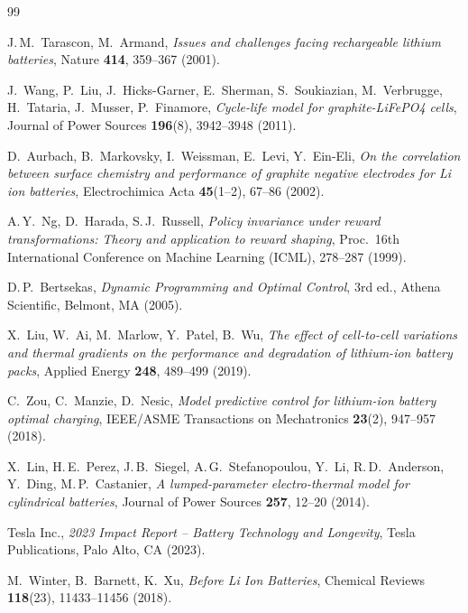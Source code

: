﻿\documentclass[12pt,a4paper]{article}
\begin{document}
	\begin{thebibliography}{99}
		
		J.\,M.\ Tarascon, M.\ Armand,
		\textit{Issues and challenges facing rechargeable lithium batteries},
		Nature \textbf{414}, 359--367 (2001).
		
		J.\ Wang, P.\ Liu, J.\ Hicks-Garner, E.\ Sherman, S.\ Soukiazian, M.\ Verbrugge,
		H.\ Tataria, J.\ Musser, P.\ Finamore,
		\textit{Cycle-life model for graphite-LiFePO4 cells},
		Journal of Power Sources \textbf{196}(8), 3942--3948 (2011).
		
		D.\ Aurbach, B.\ Markovsky, I.\ Weissman, E.\ Levi, Y.\ Ein-Eli,
		\textit{On the correlation between surface chemistry and performance of graphite negative electrodes for Li ion batteries},
		Electrochimica Acta \textbf{45}(1--2), 67--86 (2002).
		
		A.\,Y.\ Ng, D.\ Harada, S.\,J.\ Russell,
		\textit{Policy invariance under reward transformations: Theory and application to reward shaping},
		Proc.\ 16th International Conference on Machine Learning (ICML), 278--287 (1999).
		
		D.\,P.\ Bertsekas,
		\textit{Dynamic Programming and Optimal Control}, 3rd ed.,
		Athena Scientific, Belmont, MA (2005).
		
		X.\ Liu, W.\ Ai, M.\ Marlow, Y.\ Patel, B.\ Wu,
		\textit{The effect of cell-to-cell variations and thermal gradients on the performance and degradation of lithium-ion battery packs},
		Applied Energy \textbf{248}, 489--499 (2019).
		
		C.\ Zou, C.\ Manzie, D.\ Nesic,
		\textit{Model predictive control for lithium-ion battery optimal charging},
		IEEE/ASME Transactions on Mechatronics \textbf{23}(2), 947--957 (2018).
		
		X.\ Lin, H.\,E.\ Perez, J.\,B.\ Siegel, A.\,G.\ Stefanopoulou, Y.\ Li,
		R.\,D.\ Anderson, Y.\ Ding, M.\,P.\ Castanier,
		\textit{A lumped-parameter electro-thermal model for cylindrical batteries},
		Journal of Power Sources \textbf{257}, 12--20 (2014).
		
		Tesla Inc.,
		\textit{2023 Impact Report -- Battery Technology and Longevity},
		Tesla Publications, Palo Alto, CA (2023).
		
		M.\ Winter, B.\ Barnett, K.\ Xu,
		\textit{Before Li Ion Batteries},
		Chemical Reviews \textbf{118}(23), 11433--11456 (2018).
		
	\end{thebibliography}
	
\end{document}
